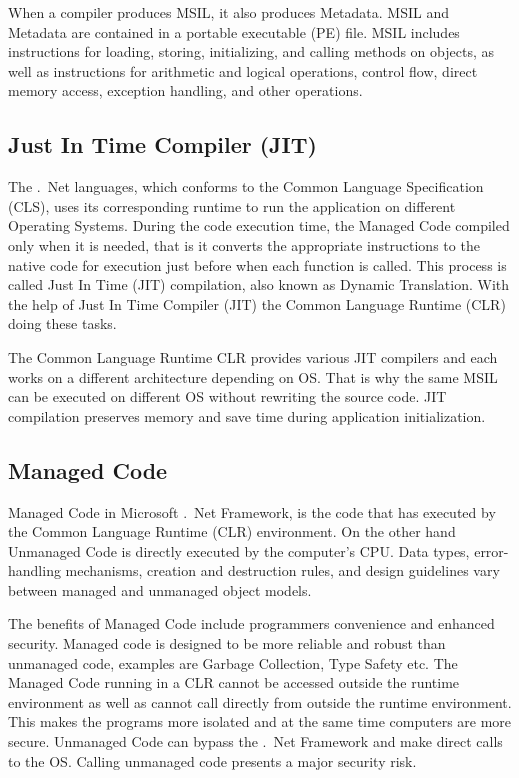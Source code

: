 When a compiler produces MSIL, it also produces Metadata. MSIL and Metadata are contained in a portable executable (PE) file. MSIL includes instructions for loading, storing, initializing, and calling methods on objects, as well as instructions for arithmetic and logical operations, control flow, direct memory access, exception handling, and other operations.

\subsection*{Just In Time Compiler (JIT)}
The .\ Net languages, which conforms to the Common Language Specification (CLS), uses its corresponding runtime to run the application on different Operating Systems. During the code execution time, the Managed Code compiled only when it is needed, that is it converts the appropriate instructions to the native code for execution just before when each function is called. This process is called Just In Time (JIT) compilation, also known as Dynamic Translation. With the help of Just In Time Compiler (JIT) the Common Language Runtime (CLR) doing these tasks.



The Common Language Runtime CLR provides various JIT compilers and each works on a different architecture depending on OS. That is why the same MSIL can be executed on different OS without rewriting the source code. JIT compilation preserves memory and save time during application initialization. 

\subsection*{Managed Code}
Managed Code in Microsoft .\ Net Framework, is the code that has executed by the Common Language Runtime (CLR) environment. On the other hand Unmanaged Code is directly executed by the computer's CPU. Data types, error-handling mechanisms, creation and destruction rules, and design guidelines vary between managed and unmanaged object models.

The benefits of Managed Code include programmers convenience and enhanced security. Managed code is designed to be more reliable and robust than unmanaged code, examples are Garbage Collection, Type Safety etc. The Managed Code running in a CLR cannot be accessed outside the runtime environment as well as cannot call directly from outside the runtime environment. This makes the programs more isolated and at the same time computers are more secure. Unmanaged Code can bypass the .\ Net Framework and make direct calls to the OS. Calling unmanaged code presents a major security risk.


